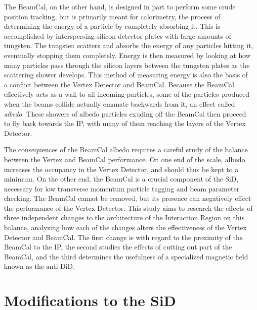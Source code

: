 \documentclass{report}
\begin{document}
                The BeamCal, on the other hand, is designed in part to perform some crude position tracking, but is primarily meant for calorimetry, the process of determining the energy of a particle by completely absorbing it. This is accomplished by interspersing silicon detector plates with large amounts of tungsten. The tungsten scatters and absorbs the energy of any particles hitting it, eventually stopping them completely. Energy is then measured by looking at how many particles pass through the silicon layers between the tungsten plates as the scattering shower develops. This method of measuring energy is also the basis of a conflict between the Vertex Detector and BeamCal. Because the BeamCal effectively acts as a wall to all incoming particles, some of the particles produced when the beams collide actually emanate backwards from it, an effect called \textit{albedo}. These showers of albedo particles exuding off the BeamCal then proceed to fly back towards the IP, with many of them reaching the layers of the Vertex Detector.
                
                The consequences of the BeamCal albedo requires a careful study of the balance between the Vertex and BeamCal performance. On one end of the scale, albedo increases the occupancy in the Vertex Detector, and should thus be kept to a minimum. On the other end, the BeamCal is a crucial component of the SiD, necessary for low transverse momentum particle tagging and beam parameter checking. The BeamCal cannot be removed, but its presence can negatively effect the performance of the Vertex Detector. This study aims to research the effects of three independent changes to the architecture of the Interaction Region on this balance, analyzing how each of the changes alters the effectiveness of the Vertex Detector and BeamCal. The first change is with regard to the proximity of the BeamCal to the IP, the second studies the effects of cutting out part of the BeamCal, and the third determines the usefulness of a specialized magnetic field known as the anti-DiD.



        \section{Modifications to the SiD} \label{sect__sid_mods}
\end{document}
